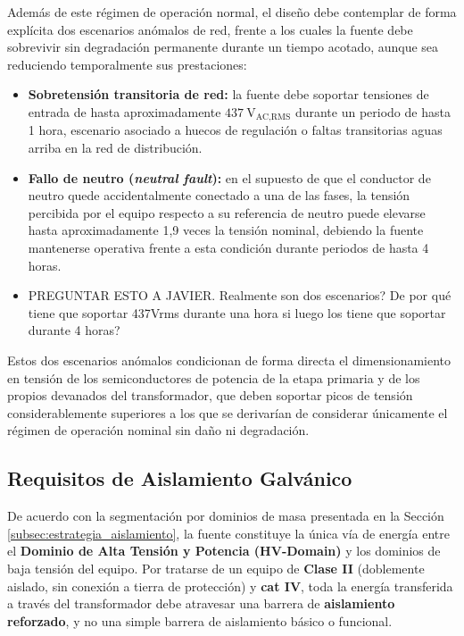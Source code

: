 Además de este régimen de operación normal, el diseño debe contemplar de forma explícita dos escenarios anómalos de red, frente a los cuales la fuente debe sobrevivir sin degradación permanente durante un tiempo acotado, aunque sea reduciendo temporalmente sus prestaciones:

\begin{itemize}
    \item \textbf{Sobretensión transitoria de red:} la fuente debe soportar tensiones de entrada de hasta aproximadamente $437\ \text{V}_{\text{AC,RMS}}$ durante un periodo de hasta 1 hora, escenario asociado a huecos de regulación o faltas transitorias aguas arriba en la red de distribución.
    \item \textbf{Fallo de neutro (\textit{neutral fault}):} en el supuesto de que el conductor de neutro quede accidentalmente conectado a una de las fases, la tensión percibida por el equipo respecto a su referencia de neutro puede elevarse hasta aproximadamente 1,9 veces la tensión nominal, debiendo la fuente mantenerse operativa frente a esta condición durante periodos de hasta 4 horas.
    \item PREGUNTAR ESTO A JAVIER. Realmente son dos escenarios? De por qué tiene que soportar 437Vrms durante una hora si luego los tiene que soportar durante 4 horas? 
\end{itemize}

Estos dos escenarios anómalos condicionan de forma directa el dimensionamiento en tensión de los semiconductores de potencia de la etapa primaria y de los propios devanados del transformador, que deben soportar picos de tensión considerablemente superiores a los que se derivarían de considerar únicamente el régimen de operación nominal sin daño ni degradación.

\subsection{Requisitos de Aislamiento Galvánico}
\label{subsec:requisitos_aislamiento_psu}

De acuerdo con la segmentación por dominios de masa presentada en la Sección \ref{subsec:estrategia_aislamiento}, la fuente constituye la única vía de energía entre el \textbf{Dominio de Alta Tensión y Potencia (HV-Domain)} y los dominios de baja tensión del equipo. Por tratarse de un equipo de \textbf{Clase II} (doblemente aislado, sin conexión a tierra de protección) y \textbf{\gls{cat} IV}, toda la energía transferida a través del transformador debe atravesar una barrera de \textbf{aislamiento reforzado}, y no una simple barrera de aislamiento básico o funcional.

